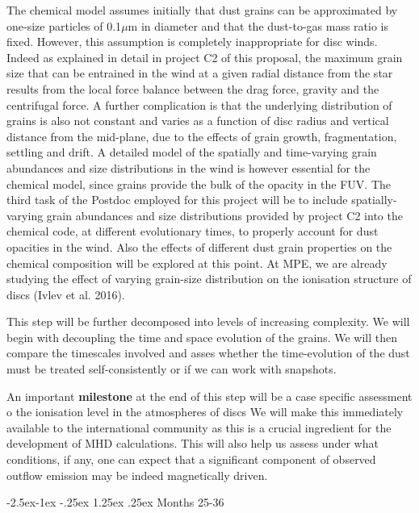 \documentclass[10pt,fleqn,twoside]{article}
\makeatletter
\renewcommand\paragraph{\@startsection{paragraph}{4}{\z@}%
            {-2.5ex\@plus -1ex \@minus -.25ex}%
            {1.25ex \@plus .25ex}%
            {\normalfont\normalsize\bfseries}}
\makeatother
\begin{document}
 The chemical model assumes initially that dust grains can be approximated by one-size particles of 0.1${\mu}$m in diameter and that the dust-to-gas mass ratio is fixed.  However, this assumption is completely inappropriate for disc winds. Indeed as explained in detail in project C2 of this proposal, the maximum grain size that can be entrained in the wind at a given radial distance from the star results from the local force balance between the drag force, gravity and the centrifugal force. A further complication is that the underlying distribution of grains is also not constant and varies as a function of disc radius and vertical distance from the mid-plane, due to the effects of grain growth, fragmentation, settling and drift. A detailed model of the spatially and time-varying grain abundances and size distributions in the wind is however essential for the chemical model, since grains provide the bulk of the opacity in the FUV. The third task of the Postdoc employed for this project will be to include spatially-varying grain abundances and size distributions
provided by project C2 into the chemical code, at different evolutionary times, to properly account for dust opacities in the wind.  Also the effects of different dust grain properties on the chemical composition will be explored at this point.  At MPE, we are already studying the effect of varying grain-size distribution on the ionisation structure of discs (Ivlev et al. 2016). 

This step will be further decomposed into levels of increasing complexity. We will begin with decoupling the time and space evolution of the grains. We will then compare the timescales involved and asses whether the time-evolution of the dust must be treated self-consistently or if we can work with snapshots. 

An important {\bf milestone} at the end of this step will be a case specific assessment o the ionisation level in the atmospheres of discs We will make this immediately available to the international community as this is a crucial ingredient for the development of MHD calculations. This will also help us assess under what conditions, if any, one can expect that a significant component of observed outflow emission may be indeed magnetically driven. 

\paragraph{Months 25-36}
\end{document}
